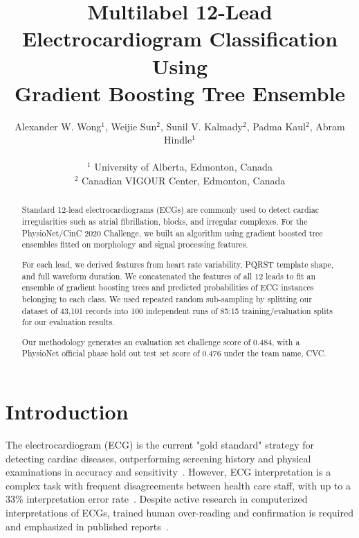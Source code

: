 \documentclass[twocolumn]{cinc}
\begin{document}


\title{Multilabel 12-Lead Electrocardiogram Classification Using \\
Gradient Boosting Tree Ensemble}

\author {Alexander W. Wong$^{1}$, Weijie Sun$^{2}$, Sunil V. Kalmady$^{2}$, Padma Kaul$^{2}$, Abram Hindle$^{1}$\\
\ \\
 $^1$ University of Alberta, Edmonton, Canada \\
$^2$ Canadian VIGOUR Center, Edmonton, Canada }

\maketitle

\newcommand{\officialscore}{{0.476} }

\begin{abstract}

Standard 12-lead electrocardiograms (ECGs) are commonly used to detect cardiac irregularities such as atrial fibrillation, blocks, and irregular complexes.
For the PhysioNet/CinC 2020 Challenge, we built an algorithm using gradient boosted tree ensembles fitted on morphology and signal processing features.

For each lead, we derived features from heart rate variability, PQRST template shape, and full waveform duration.
We concatenated the features of all 12 leads to fit an ensemble of gradient boosting trees and predicted probabilities of ECG instances belonging to each class.
We used repeated random sub-sampling by splitting our dataset of 43,101 records into 100 independent runs of 85:15 training/evaluation splits for our evaluation results.

Our methodology generates an evaluation set challenge score of 0.484, with a PhysioNet official phase hold out test set score of \officialscore under the team name, CVC.

\end{abstract}

\section{Introduction}

The electrocardiogram (ECG) is the current "gold standard" strategy for detecting cardiac diseases, outperforming screening history and physical examinations in accuracy and sensitivity~\cite{harmon_effectiveness_2015}.
However, ECG interpretation is a complex task with frequent disagreements between health care staff, with up to a 33\% interpretation error rate~\cite{mele_improving_2008}.
Despite active research in computerized interpretations of ECGs, trained human over-reading and confirmation is required and emphasized in published reports~\cite{schlapfer_computer-interpreted_2017}.
\end{document}
